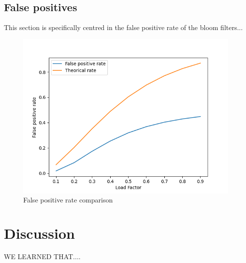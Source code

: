 \documentclass{article}
\begin{document}
    	\subsection*{False positives}
	    	This section is specifically centred in the false positive rate of the bloom filters...
	    	\begin{figure}[h!]
		  \includegraphics[width=\linewidth]{images/loadFactor_vs_falsePositives.png}
		  \caption{False positive rate comparison}
		  \label{fig:False positive rate}
		\end{figure}
    	
    	
    

    \section{Discussion}
	WE LEARNED THAT....


    \printbibliography
\end{document}
